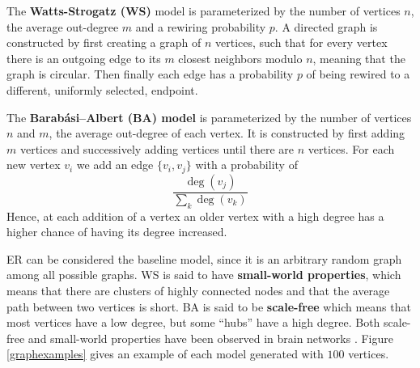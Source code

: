 \begin{definition}
The \textbf{Watts-Strogatz (WS)} model is parameterized by the number of vertices $n$, the average out-degree $m$ and a rewiring probability $p$. A directed graph is constructed by first creating a graph of $n$ vertices, such that for every vertex there is an outgoing edge to its $m$ closest neighbors modulo $n$, meaning that the graph is circular. Then finally each edge has a probability $p$ of being rewired to a different, uniformly selected, endpoint.
\end{definition}

\begin{definition}
  The \textbf{Barabási–Albert (BA) model} is parameterized by the number of vertices $n$ and $m$, the average out-degree of each vertex. It is constructed by first adding $m$ vertices and successively adding vertices until there are $n$ vertices. For each new vertex $v_{i}$ we add an edge $\{v_{i},v_{j}\}$  with a probability of
  \[
    \frac{\deg(v_{j})}{\sum_{k} \deg(v_{k})}
  \]
  Hence, at each addition of a vertex an older vertex with a high degree has a higher chance of having its degree increased.
\end{definition}
ER can be considered the baseline model, since it is an arbitrary random graph among all possible graphs. WS is said to have \textbf{small-world properties}, which means that there are clusters of highly connected nodes and that the average path between two vertices is short. BA is said to be \textbf{scale-free} which means that most vertices have a low degree, but some ``hubs'' have a high degree. Both scale-free and small-world properties have been observed in brain networks \cite{SPORNS2004418}. Figure \ref{graphexamples} gives an example of each model generated with $100$ vertices.

